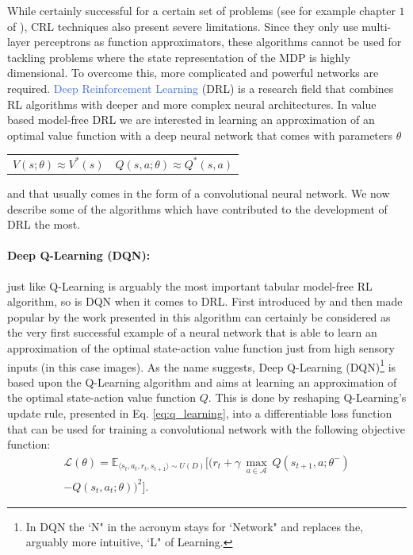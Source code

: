 While certainly successful for a certain set of problems (see for example chapter $1$ of \cite{sabatelli2017learning}), CRL techniques also present severe limitations. Since they only use multi-layer perceptrons as function approximators, these algorithms cannot be used for tackling problems where the state representation of the MDP is highly dimensional. To overcome this, more complicated and powerful networks are required. \textcolor{RoyalBlue}{Deep Reinforcement Learning} (DRL) \cite{arulkumaran2017deep, li2017deep, franccois2018introduction} is a research field that combines RL algorithms with deeper and more complex neural architectures. In value based model-free DRL we are interested in learning an approximation of an optimal value function with a deep neural network that comes with parameters $\theta$

\noindent
\begin{tabularx}{\linewidth}{@{}XX@{}}
\begin{equation}
	  V(s;\theta)\approx V^{*}(s)
	  \label{eq:v_approx}
  \end{equation}
&
\begin{equation}  
	Q(s,a;\theta)\approx Q^{*}(s,a)
	\label{eq:q_approx}
  \end{equation}
\end{tabularx}
and that usually comes in the form of a convolutional neural network. We now describe some of the algorithms which have contributed to the development of DRL the most. 


\paragraph{Deep Q-Learning (DQN):} just like Q-Learning is arguably the most important tabular model-free RL algorithm, so is DQN when it comes to DRL. First introduced by \citet{mnih2013playing} and then made popular by the work presented in \cite{mnih2015human} this algorithm can certainly be considered as the very first successful example of a neural network that is able to learn an approximation of the optimal state-action value function just from high sensory inputs (in this case images). As the name suggests, Deep Q-Learning (DQN)\footnote{In DQN the `N" in the acronym stays for `Network" and replaces the, arguably more intuitive, `L" of Learning.} is based upon the Q-Learning algorithm and aims at learning an approximation of the optimal state-action value function $Q$. This is done by reshaping Q-Learning's update rule, presented in Eq. \ref{eq:q_learning}, into a differentiable loss function that can be used for training a convolutional network with the following objective function:
\begin{multline}
	\mathcal{L}(\theta) = \mathds{E}_{\langle s_{t},a_{t},r_{t},s_{t+1}\rangle\sim U(D)} \bigg[\big(r_{t} + \gamma \: \underset{a\in \mathcal{A}}{\max}\: Q(s_{t+1}, a; \theta^{-}) \\ - Q(s_{t}, a_{t}; \theta)\big)^{2}\bigg].
\label{eq:dqn}
\end{multline}

